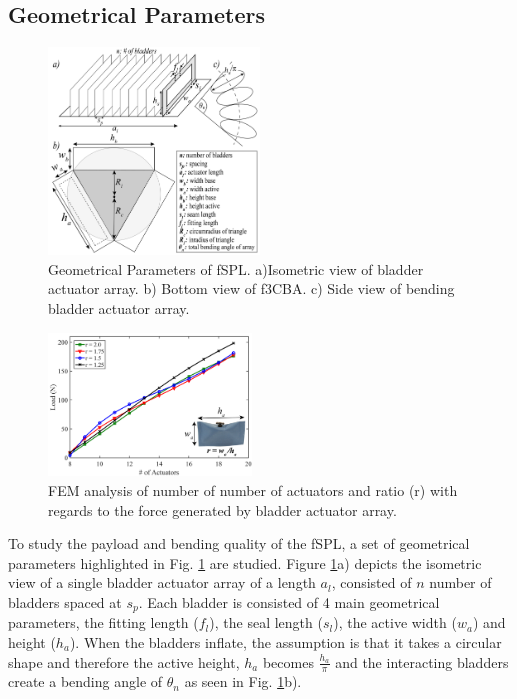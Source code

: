 \documentclass[letterpaper, 10 pt, conference]{ieeeconf}  %
\begin{document}
\subsection{Geometrical Parameters}

\begin{figure}[b!]
\centering
\includegraphics[width=0.5\textwidth]{Figures/geom_param_v5}
\caption{Geometrical Parameters of fSPL. a)Isometric view of bladder actuator array. b) Bottom view of f3CBA. c) Side view of bending bladder actuator array.}
\label{fig:geom_param}
\vspace{-1.5em}
\end{figure}


\begin{figure}[t!]
\centering
\includegraphics[width=0.48\textwidth]{Figures/fem_opti_v4}
\caption{FEM analysis of number of number of actuators and ratio (r) with regards to the force generated by bladder actuator array.}
\label{fig:fem_opti}
\vspace{-1.5em}
\end{figure}

To study the payload and bending quality of the fSPL, a set of geometrical parameters highlighted in Fig. \ref{fig:geom_param} are studied. Figure \ref{fig:geom_param}a) depicts the isometric view of a single bladder actuator array of a length $a_{l}$, consisted of $n$ number of bladders spaced at $s_{p}$. Each bladder is consisted of 4 main geometrical parameters, the fitting length ($f_{l}$), the seal length ($s_{l}$), the active width ($w_{a}$) and height ($h_{a}$). When the bladders inflate, the assumption is that it takes a circular shape and therefore the active height, $h_{a}$ becomes $\frac{h_a}{\pi}$ and the interacting bladders create a bending angle of $\theta_{n}$ as seen in Fig. \ref{fig:geom_param}b). 
\end{document}
